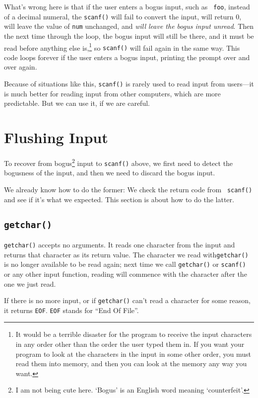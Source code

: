 What's wrong here is that if the user enters a bogus input, such as {\tt
foo}, instead of a decimal numeral, the {\tt scanf()} will fail to
convert the input, will return 0, will leave the value of {\tt num}
unchanged, and {\em will leave the bogus input unread}\/.  Then the next
time through the loop, the bogus input will still be there, and it must
be read before anything else is,\footnote{It would be a terrible
disaster for the program to receive the input characters in any order
other than the order the user typed them in.  If you want your program
to look at the characters in the input in some other order, you must
read them into memory, and then you can look at the memory any way you
want.} so {\tt scanf()} will fail again in the same way.  This code
loops forever if the user enters a bogus input, printing the prompt over
and over again.

Because of situations like this, {\tt scanf()} is rarely used to read
input from users---it is much better for reading input from other
computers, which are more predictable.  But we can use it, if we are
careful.

\section{Flushing Input}

To recover from bogus\footnote{I am not being cute here.  `Bogus' is an
English word meaning `counterfeit'.} input to {\tt scanf()} above, we
first need to detect the bogusness of the input, and then we need to
discard the bogus input.

We already know how to do the former: We check the return code from {\tt
scanf()} and see if it's what we expected.  This section is about how to
do the latter.

\subsection{{\tt getchar()}}

{\tt getchar()} accepts no arguments.  It reads one character from the
input and returns that character as its return value.  The character we
read with{\tt getchar()} is no longer available to be read again; next
time we call {\tt getchar()} or {\tt scanf()} or any other input
function, reading will commence with the character after the one we just
read.

If there is no more input, or if {\tt getchar()} can't read a character
for some reason, it returns {\tt EOF}.  {\tt EOF} stands for ``End Of
File''.  

